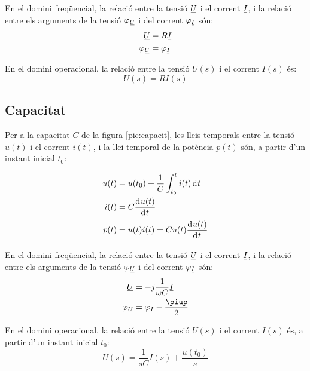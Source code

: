 En el domini freqüencial, la relació entre
la tensió $\cmplx{U}$ i el corrent $\cmplx{I}$, i la relació entre els arguments de
la tensió $\varphi_{\cmplx{U}}$ i del corrent $\varphi_{\cmplx{I}}$ són:
\begin{align}
	\cmplx{U} &= R \cmplx{I} \\ \varphi_{\cmplx{U}} &= \varphi_{\cmplx{I}}
\end{align}

 En el domini operacional, la relació entre la tensió $U(s)$ i el corrent $I(s)$ és:
\begin{equation}
	U(s) = R I(s)
\end{equation}

\subsection{Capacitat} 

Per a la capacitat $C$ de la figura
\vref{pic:capacit}, les lleis temporals entre la tensió $u(t)$ i el
corrent $i(t)$, i la llei temporal de la potència $p(t)$ són, a partir d'un instant inicial $t_0$:

\hfill
\begin{minipage}[b]{5cm}
	
	\label{pic:capacit}
\end{minipage}
\hfill
\begin{minipage}[b][3.8cm][t]{8cm}
	\begin{align}
		u(t) &= u(t_0) + \frac{1}{C} \int_{t_0}^t i(t) \diff t \\
		i(t) &= C \deriv{u(t)}{t} \\
		p(t) &= u(t) i(t) = C u(t) \deriv{u(t)}{t}
	\end{align}
\end{minipage}

En el domini freqüencial, la relació entre la tensió $\cmplx{U}$ i el corrent $\cmplx{I}$, i la relació entre els arguments de la tensió $\varphi_{\cmplx{U}}$ i del corrent $\varphi_{\cmplx{I}}$ són:
\begin{align}
	\cmplx{U} &= -j \frac{1}{\omega C} \cmplx{I} \\
	\varphi_{\cmplx{U}} &= \varphi_{\cmplx{I}} - \frac{\piup}{2}
\end{align}

En el domini operacional, la relació entre la tensió $U(s)$ i el corrent $I(s)$ és, a partir d'un instant inicial $t_0$:
\begin{equation}
	U(s) = \frac{1}{s C} I(s) + \frac{u(t_0)}{s}
\end{equation}


